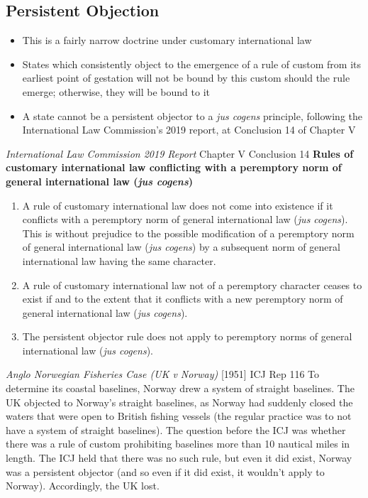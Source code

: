 \subsection{Persistent Objection}
\begin{itemize}
    \item This is a fairly narrow doctrine under customary international law
    \item States which consistently object to the emergence of a rule of custom from its earliest point of gestation will not be bound by this custom should the rule emerge; otherwise, they will be bound to it
    \item A state cannot be a persistent objector to a \textit{jus cogens} principle, following the International Law Commission's 2019 report, at Conclusion 14 of Chapter V
\end{itemize}

\begin{conventiondetails}{\textit{International Law Commission 2019 Report} Chapter V Conclusion 14}\label{report:2019 ILC Conc. 14}
    \flushleft
    \textbf{Rules of customary international law conflicting with a peremptory norm of general international law (\textit{jus cogens})}

    \begin{enumerate}
        \item A rule of customary international law does not come into existence if it conflicts with a peremptory norm of general international law (\textit{jus cogens}). This is without prejudice to the possible modification of a peremptory norm of general international law (\textit{jus cogens}) by a subsequent norm of general international law having the same character.
        \item A rule of customary international law not of a peremptory character ceases to exist if and to the extent that it conflicts with a new peremptory norm of general international law (\textit{jus cogens}).
        \item The persistent objector rule does not apply to peremptory norms of general international law (\textit{jus cogens}).
    \end{enumerate}
\end{conventiondetails}

\begin{casedetails}{\textit{Anglo Norwegian Fisheries Case (UK v Norway)} [1951] ICJ Rep 116}\label{case:UK v Norway Fisheries}
    \flushleft
    To determine its coastal baselines, Norway drew a system of straight baselines. The UK objected to Norway's straight baselines, as Norway had suddenly closed the waters that were open to British fishing vessels (the regular practice was to not have a system of straight baselines). The question before the ICJ was whether there was a rule of custom prohibiting baselines more than 10 nautical miles in length. The ICJ held that there was no such rule, but even it did exist, Norway was a persistent objector (and so even if it did exist, it wouldn't apply to Norway). Accordingly, the UK lost.
\end{casedetails}

